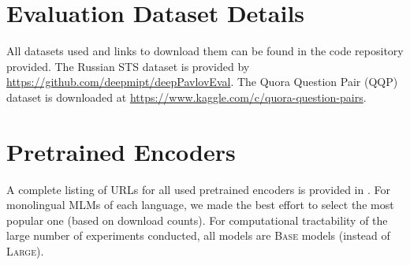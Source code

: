 \documentclass[11pt]{article}
\begin{document}
\section{Evaluation Dataset Details}
All datasets used and links to download them can be found in the code repository provided. The Russian STS dataset is provided by \\
\url{https://github.com/deepmipt/deepPavlovEval}. The Quora Question Pair (QQP) dataset is downloaded at  \url{https://www.kaggle.com/c/quora-question-pairs}.

\section{Pretrained Encoders}\label{sec:appendix_huggingface_urls}
A complete listing of URLs for all used pretrained encoders is provided in . For monolingual MLMs of each language, we made the best effort to select the most popular one (based on download counts). For computational tractability of the large number of experiments conducted, all models are \textsc{Base} models (instead of \textsc{Large}).
\end{document}
